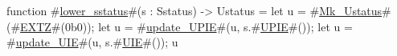 function #\hyperref[sailRISCVzlowerzysstatus]{lower\_sstatus}#(s : Sstatus) -> Ustatus = {
  let u = #\hyperref[sailRISCVzMkzyUstatus]{Mk\_Ustatus}#(#\hyperref[sailRISCVzEXTZ]{EXTZ}#(0b0));
  let u = #\hyperref[sailRISCVzupdatezyUPIE]{update\_UPIE}#(u, s.#\hyperref[sailRISCVzUPIE]{UPIE}#());
  let u = #\hyperref[sailRISCVzupdatezyUIE]{update\_UIE}#(u, s.#\hyperref[sailRISCVzUIE]{UIE}#());
  u
}
